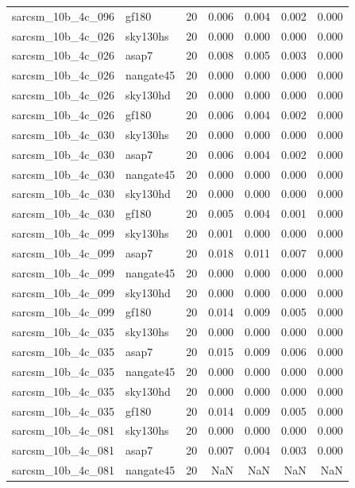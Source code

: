 \begin{tabular}{llrrrrr}
sarcsm\_10b\_4c\_096 & gf180 & 20 & 0.006 & 0.004 & 0.002 & 0.000 \\
sarcsm\_10b\_4c\_026 & sky130hs & 20 & 0.000 & 0.000 & 0.000 & 0.000 \\
sarcsm\_10b\_4c\_026 & asap7 & 20 & 0.008 & 0.005 & 0.003 & 0.000 \\
sarcsm\_10b\_4c\_026 & nangate45 & 20 & 0.000 & 0.000 & 0.000 & 0.000 \\
sarcsm\_10b\_4c\_026 & sky130hd & 20 & 0.000 & 0.000 & 0.000 & 0.000 \\
sarcsm\_10b\_4c\_026 & gf180 & 20 & 0.006 & 0.004 & 0.002 & 0.000 \\
sarcsm\_10b\_4c\_030 & sky130hs & 20 & 0.000 & 0.000 & 0.000 & 0.000 \\
sarcsm\_10b\_4c\_030 & asap7 & 20 & 0.006 & 0.004 & 0.002 & 0.000 \\
sarcsm\_10b\_4c\_030 & nangate45 & 20 & 0.000 & 0.000 & 0.000 & 0.000 \\
sarcsm\_10b\_4c\_030 & sky130hd & 20 & 0.000 & 0.000 & 0.000 & 0.000 \\
sarcsm\_10b\_4c\_030 & gf180 & 20 & 0.005 & 0.004 & 0.001 & 0.000 \\
sarcsm\_10b\_4c\_099 & sky130hs & 20 & 0.001 & 0.000 & 0.000 & 0.000 \\
sarcsm\_10b\_4c\_099 & asap7 & 20 & 0.018 & 0.011 & 0.007 & 0.000 \\
sarcsm\_10b\_4c\_099 & nangate45 & 20 & 0.000 & 0.000 & 0.000 & 0.000 \\
sarcsm\_10b\_4c\_099 & sky130hd & 20 & 0.000 & 0.000 & 0.000 & 0.000 \\
sarcsm\_10b\_4c\_099 & gf180 & 20 & 0.014 & 0.009 & 0.005 & 0.000 \\
sarcsm\_10b\_4c\_035 & sky130hs & 20 & 0.000 & 0.000 & 0.000 & 0.000 \\
sarcsm\_10b\_4c\_035 & asap7 & 20 & 0.015 & 0.009 & 0.006 & 0.000 \\
sarcsm\_10b\_4c\_035 & nangate45 & 20 & 0.000 & 0.000 & 0.000 & 0.000 \\
sarcsm\_10b\_4c\_035 & sky130hd & 20 & 0.000 & 0.000 & 0.000 & 0.000 \\
sarcsm\_10b\_4c\_035 & gf180 & 20 & 0.014 & 0.009 & 0.005 & 0.000 \\
sarcsm\_10b\_4c\_081 & sky130hs & 20 & 0.000 & 0.000 & 0.000 & 0.000 \\
sarcsm\_10b\_4c\_081 & asap7 & 20 & 0.007 & 0.004 & 0.003 & 0.000 \\
sarcsm\_10b\_4c\_081 & nangate45 & 20 & NaN & NaN & NaN & NaN \\

\end{tabular}
